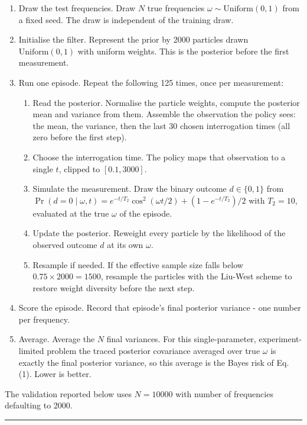 \documentclass[12pt,a4paper]{article}
\begin{document}
\begin{enumerate}
  \item Draw the test frequencies. Draw $N$ true frequencies $\omega \sim \mathrm{Uniform}(0,1)$
  from a fixed seed. The draw is independent of the training draw.
  \item Initialise the filter. Represent the prior by \num{2000} particles drawn
  $\mathrm{Uniform}(0,1)$ with uniform weights. This is the posterior before the first measurement.
  \item Run one episode. Repeat the following \num{125} times, once per measurement:
  \begin{enumerate}
    \item Read the posterior. Normalise the particle weights, compute the posterior mean and variance
    from them. Assemble the observation the policy sees: the mean, the variance, then the last
    \num{30} chosen interrogation times (all zero before the first step).
    \item Choose the interrogation time. The policy maps that observation to a single $t$, clipped
    to $[0.1, 3000]$.
    \item Simulate the measurement. Draw the binary outcome $d \in \{0,1\}$ from $\Pr(d = 0 \mid
    \omega, t) = e^{-t/T_2}\cos^2(\omega t/2) + (1 - e^{-t/T_2})/2$ with $T_2 = 10$, evaluated at
    the true $\omega$ of the episode.
    \item Update the posterior. Reweight every particle by the likelihood of the observed outcome
    $d$ at its own $\omega$.
    \item Resample if needed. If the effective sample size falls below $0.75 \times \num{2000} =
    \num{1500}$, resample the particles with the Liu-West scheme to restore weight diversity before
    the next step.
  \end{enumerate}
  \item Score the episode. Record that episode's final posterior variance - one number per
  frequency.
  \item Average. Average the $N$ final variances. For this single-parameter, experiment-limited
  problem the traced posterior covariance averaged over true $\omega$ is exactly the final posterior
  variance, so this average is the Bayes risk of
  Eq. (1). Lower is better.
\end{enumerate}

The validation reported below uses $N = \num{10000}$ with number of frequencies defaulting to \num{2000}.

\noindent\rule{\textwidth}{0.4pt}
\FloatBarrier
\end{document}
